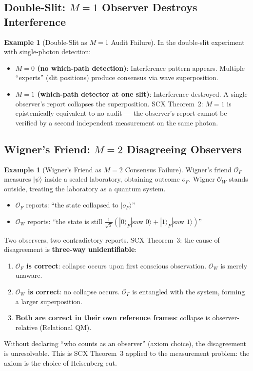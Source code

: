 \documentclass[11pt,a4paper]{article}
\newcommand{\ket}[1]{|#1\rangle}
\theoremstyle{definition}
\newtheorem{example}[theorem]{Example}
\theoremstyle{remark}
\newcommand{\Obs}{\mathcal{O}}
\begin{document}
\subsection{Double-Slit: $M=1$ Observer Destroys Interference}

\begin{example}[Double-Slit as $M=1$ Audit Failure]
In the double-slit experiment with single-photon detection:
\begin{itemize}[nosep]
    \item \textbf{$M=0$ (no which-path detection)}: Interference pattern appears. Multiple ``experts'' (slit positions) produce consensus via wave superposition.
    \item \textbf{$M=1$ (which-path detector at one slit)}: Interference destroyed. A single observer's report collapses the superposition. SCX Theorem~2: $M=1$ is epistemically equivalent to no audit --- the observer's report cannot be verified by a second independent measurement on the same photon.
\end{itemize}
\end{example}

\subsection{Wigner's Friend: $M=2$ Disagreeing Observers}

\begin{example}[Wigner's Friend as $M=2$ Consensus Failure]
Wigner's friend $\Obs_F$ measures $\ket{\psi}$ inside a sealed laboratory, obtaining outcome $o_F$. Wigner $\Obs_W$ stands outside, treating the laboratory as a quantum system.

\begin{itemize}[nosep]
    \item $\Obs_F$ reports: ``the state collapsed to $\ket{o_F}$''
    \item $\Obs_W$ reports: ``the state is still $\frac{1}{\sqrt{2}}(\ket{0}_F\ket{\text{saw }0} + \ket{1}_F\ket{\text{saw }1})$''
\end{itemize}

Two observers, two contradictory reports. SCX Theorem~3: the cause of disagreement is \textbf{three-way unidentifiable}:
\begin{enumerate}[nosep]
    \item \textbf{$\Obs_F$ is correct}: collapse occurs upon first conscious observation. $\Obs_W$ is merely unaware.
    \item \textbf{$\Obs_W$ is correct}: no collapse occurs. $\Obs_F$ is entangled with the system, forming a larger superposition.
    \item \textbf{Both are correct in their own reference frames}: collapse is observer-relative (Relational QM).
\end{enumerate}
Without declaring ``who counts as an observer'' (axiom choice), the disagreement is unresolvable. This is SCX Theorem~3 applied to the measurement problem: the axiom is the choice of Heisenberg cut.
\end{example}
\end{document}
